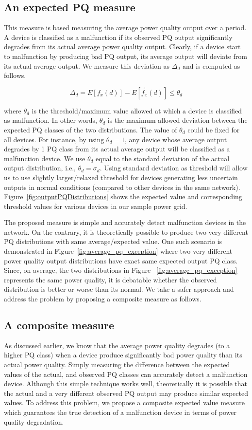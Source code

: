 \subsection{An expected PQ measure}
This measure is based measuring the average power quality output over a period. A device is classified as a malfunction if its observed PQ output significantly degrades from its actual average power quality output. Clearly, if a device start to malfunction by producing bad PQ output, its average output will deviate from its actual average output. We measure this deviation as $\Delta_d$ and is computed as follows.

\[\Delta_d = E[f_x(d)] - E[\overset{\circ}{f_x}(d)] \leq \theta_d \]

\noindent where $\theta_d$ is the threshold/maximum value allowed at which a device is classified as malfunction. In other words, $\theta_d$ is the maximum allowed deviation between the expected PQ classes of the two distributions. The value of $\theta_d$ could be fixed for all devices. For instance, by using $\theta_d = 1$, any device whose average output degrades by 1 PQ class from its actual average output will be classified as a malfunction device. We use $\theta_d$ equal to the standard deviation of the actual output distribution, i.e., $\theta_d=\sigma_d$. Using standard deviation as threshold will allow us to use slightly larger/relaxed threshold for devices generating less uncertain outputs in normal conditions (compared to other devices in the same network). Figure~\ref{fig:outputPQDistributions} shows the expected value and corresponding threshold values for various devices in our sample power grid.

The proposed measure is simple and accurately detect malfunction devices in the network. On the contrary, it is theoretically possible to produce two very different PQ distributions with same average/expected value. One such scenario is demonstrated in Figure~\ref{fig:average_pq_exception} where two very different power quality output distributions have exact same expected output PQ class. Since, on average, the two distributions in Figure ~\ref{fig:average_pq_exception} represents the same power quality, it is debatable whether the observed distribution is better or worse than its normal. We take a safer approach and address the problem by proposing a composite measure as follows.

\subsection{A composite measure}
As discussed earlier, we know that the average power quality degrades (to a higher PQ class) when a device produce significantly bad power quality than its actual power quality. Simply measuring the difference between the expected values of the actual, and observed PQ classes can accurately detect a malfunction device. Although this simple technique works well, theoretically it is possible that the actual and a very different observed PQ output may produce similar expected values. To address this problem, we propose a composite expected value measure which guarantees the true detection of a malfunction device in terms of power quality degradation.

